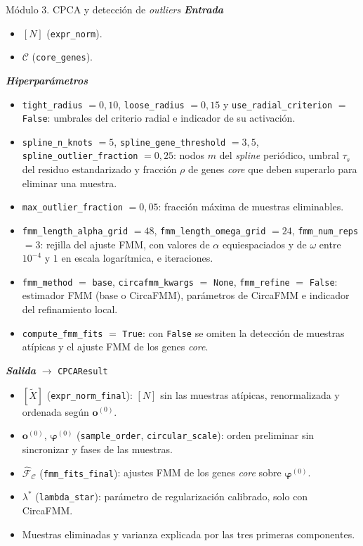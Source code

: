 \documentclass[12pt, a4paper]{report}
\newcommand{\dato}[2]{{\boldmath\textcolor{#1}{#2}}}
\begin{document}
\begin{panel}{Módulo 3. CPCA y detección de \textit{outliers}}
\textit{\textbf{Entrada}}
\begin{itemize}[nosep,leftmargin=1.5em]
\item \dato{dN}{\([N]\) (\texttt{expr\_norm})}.
\item \dato{dC}{\(\mathcal{C}\) (\texttt{core\_genes})}.
\end{itemize}

\textit{\textbf{Hiperparámetros}}
\begin{itemize}[nosep,leftmargin=1.5em]
\item \texttt{tight\_radius} \(=0{,}10\), \texttt{loose\_radius} \(=0{,}15\) y \texttt{use\_radial\_criterion} \(=\) \texttt{False}: umbrales del criterio radial e indicador de su activación.
\item \texttt{spline\_n\_knots} \(=5\), \texttt{spline\_gene\_threshold} \(=3{,}5\), \texttt{spline\_outlier\_fraction} \(=0{,}25\): nodos \(m\) del \textit{spline} periódico, umbral \(\tau_s\) del residuo estandarizado y fracción \(\rho\) de genes \textit{core} que deben superarlo para eliminar una muestra.
\item \texttt{max\_outlier\_fraction} \(=0{,}05\): fracción máxima de muestras eliminables.
\item \texttt{fmm\_length\_alpha\_grid} \(=48\), \texttt{fmm\_length\_omega\_grid} \(=24\), \texttt{fmm\_num\_reps} \(=3\): rejilla del ajuste FMM, con valores de \(\alpha\) equiespaciados y de \(\omega\) entre \(10^{-4}\) y \(1\) en escala logarítmica, e iteraciones.
\item \texttt{fmm\_method} \(=\) \texttt{base}, \texttt{circafmm\_kwargs} \(=\) \texttt{None}, \texttt{fmm\_refine} \(=\) \texttt{False}: estimador FMM (base o CircaFMM), parámetros de CircaFMM e indicador del refinamiento local.
\item \texttt{compute\_fmm\_fits} \(=\) \texttt{True}: con \texttt{False} se omiten la detección de muestras atípicas y el ajuste FMM de los genes \textit{core}.
\end{itemize}

\textit{\textbf{Salida}} \(\rightarrow\) \texttt{CPCAResult}
\begin{itemize}[nosep,leftmargin=1.5em]
\item \dato{dP}{\([\widetilde{X}]\) (\texttt{expr\_norm\_final})}: \([N]\) sin las muestras atípicas, renormalizada y ordenada según \(\mathbf{o}^{(0)}\).
\item \dato{dP}{\(\mathbf{o}^{(0)}\), \(\boldsymbol{\varphi}^{(0)}\) (\texttt{sample\_order}, \texttt{circular\_scale})}: orden preliminar sin sincronizar y fases de las muestras.
\item \dato{dP}{\(\widehat{\mathcal{F}}_{\mathcal{C}}\) (\texttt{fmm\_fits\_final})}: ajustes FMM de los genes \textit{core} sobre \(\boldsymbol{\varphi}^{(0)}\).
\item \dato{dL}{\(\lambda^{*}\) (\texttt{lambda\_star})}: parámetro de regularización calibrado, solo con CircaFMM.
\item Muestras eliminadas y varianza explicada por las tres primeras componentes.
\end{itemize}
\end{panel}
\end{document}

